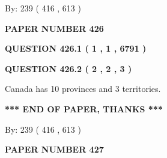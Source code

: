 \documentclass[12pt]{article}
\begin{document}
   
\hspace{1.0in} By: 
 239 ( 416 ,  613 )
   
   
   
   
\newpage 
\setcounter{page}{ 
   426001 } 
   
   
   
   
 {\textbf{ \Large{ PAPER NUMBER  426  }}}
   
   
\vspace{0.2in}
   
   
   
   
   
   
 \vspace{0.2in}
 
 
 
 
   
   
  
\vspace{0.2in}
  
{\textbf{\Large{QUESTION
426.1 
 ( 1 , 1 , 6791 )
}}}
  
  
  
\vspace{0.2in}
  
{\textbf{\Large{QUESTION
426.2 
 ( 2 , 2 , 3 )
}}}
  
  
 
 
\noindent{}
 
 
Canada has 10  provinces and 3 territories.
 
 
 
 
   
   
 \vspace{0.2in}
 
   
   
   
   
\vspace{1.0in} 
{\textbf{\large{ *** END OF PAPER, THANKS *** }}} 
   
   
\hspace{1.0in} By: 
 239 ( 416 ,  613 )
   
   
   
   
\newpage 
\setcounter{page}{ 
   427001 } 
   
   
   
   
 {\textbf{ \Large{ PAPER NUMBER  427  }}}
   
\end{document}
